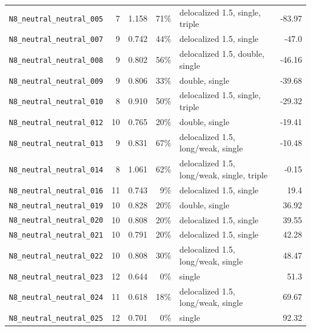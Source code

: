 {\begin{longtable}{@{}p{4.6cm}rrrp{2.4cm}r@{}}
\texttt{N8\_neutral\_neutral\_005} & 7 & 1.158 & 71\% & delocalized 1.5, single, triple & -83.97 \\
\texttt{N8\_neutral\_neutral\_007} & 9 & 0.742 & 44\% & delocalized 1.5, single & -47.0 \\
\texttt{N8\_neutral\_neutral\_008} & 9 & 0.802 & 56\% & delocalized 1.5, double, single & -46.16 \\
\texttt{N8\_neutral\_neutral\_009} & 9 & 0.806 & 33\% & double, single & -39.68 \\
\texttt{N8\_neutral\_neutral\_010} & 8 & 0.910 & 50\% & delocalized 1.5, single, triple & -29.32 \\
\texttt{N8\_neutral\_neutral\_012} & 10 & 0.765 & 20\% & double, single & -19.41 \\
\texttt{N8\_neutral\_neutral\_013} & 9 & 0.831 & 67\% & delocalized 1.5, long/weak, single & -10.48 \\
\texttt{N8\_neutral\_neutral\_014} & 8 & 1.061 & 62\% & delocalized 1.5, long/weak, single, triple & -0.15 \\
\texttt{N8\_neutral\_neutral\_016} & 11 & 0.743 & 9\% & delocalized 1.5, single & 19.4 \\
\texttt{N8\_neutral\_neutral\_019} & 10 & 0.828 & 20\% & double, single & 36.92 \\
\texttt{N8\_neutral\_neutral\_020} & 10 & 0.808 & 20\% & delocalized 1.5, single & 39.55 \\
\texttt{N8\_neutral\_neutral\_021} & 10 & 0.791 & 20\% & delocalized 1.5, single & 42.28 \\
\texttt{N8\_neutral\_neutral\_022} & 10 & 0.808 & 30\% & delocalized 1.5, long/weak, single & 48.47 \\
\texttt{N8\_neutral\_neutral\_023} & 12 & 0.644 & 0\% & single & 51.3 \\
\texttt{N8\_neutral\_neutral\_024} & 11 & 0.618 & 18\% & delocalized 1.5, long/weak, single & 69.67 \\
\texttt{N8\_neutral\_neutral\_025} & 12 & 0.701 & 0\% & single & 92.32 \\
\end{longtable}
}